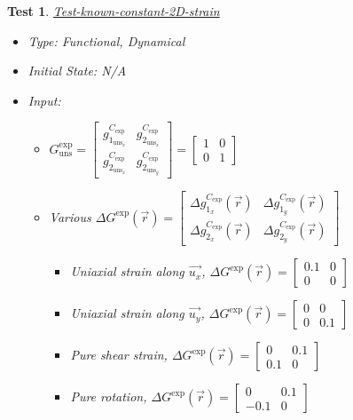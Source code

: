 \documentclass[12pt, titlepage]{article}
\newtheorem{Test}{Test}
\begin{document}
\begin{Test}\normalfont\underline{Test-known-constant-2D-strain}
\label{T_known-constant-2D-strain}
\begin{itemize}
\item Type: Functional, Dynamical
\item Initial State: N/A
\item Input:
\begin{itemize}
	\item $G_{\text{uns}}^{\text{exp}} =
	\begin{bmatrix}
	g_{1_{{\text{uns}}_x}}^{C_{\text{exp}}} & g_{2_{{\text{uns}}_x}}^{C_{\text{exp}}} \\
	g_{2_{{\text{uns}}_x}}^{C_{\text{exp}}} & g_{2_{{\text{uns}}_y}}^{C_{\text{exp}}} 
	\end{bmatrix} =\begin{bmatrix}
	1 & 0 \\
	0 & 1 
	\end{bmatrix}$
	\item Various $\Delta G^{\text{exp}}(\vec{r}) =
	\begin{bmatrix}
	\Delta g_{1_{x}}^{C_{\text{exp}}}(\vec{r}) & \Delta g_{1_{y}}^{C_{\text{exp}}}(\vec{r}) \\
	\Delta g_{2_{x}}^{C_{\text{exp}}}(\vec{r}) & \Delta g_{2_{y}}^{C_{\text{exp}}}(\vec{r})
	\end{bmatrix}$
		\begin{itemize}
		\item Uniaxial strain along $\vec{u_x}$, $\Delta G^{\text{exp}}(\vec{r}) = \begin{bmatrix}
	0.1 & 0 \\
	0 & 0 
	\end{bmatrix} $
		\item Uniaxial strain along $\vec{u_y}$, $\Delta G^{\text{exp}}(\vec{r}) = \begin{bmatrix}
	0 & 0 \\
	0 & 0.1 
	\end{bmatrix} $
		\item Pure shear strain, $\Delta G^{\text{exp}}(\vec{r}) = \begin{bmatrix}
	0 & 0.1 \\
	0.1 & 0 
	\end{bmatrix} $
		\item Pure rotation, $\Delta G^{\text{exp}}(\vec{r}) = \begin{bmatrix}
	0 & 0.1 \\
	-0.1 & 0 
	\end{bmatrix} $
		\end{itemize}	
	

\end{itemize}
\end{itemize}
\end{Test}
\end{document}

